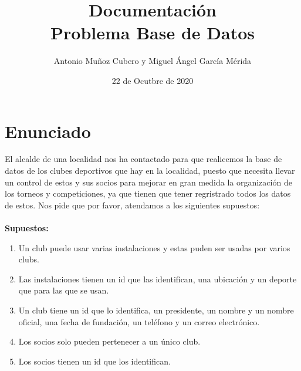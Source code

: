 \documentclass{article}
\title{Documentación \\\large \textbf{Problema Base de Datos}}
\author{Antonio Muñoz Cubero y Miguel Ángel García Mérida}
\date{22 de Ocutbre de 2020}
\begin{document}
  \maketitle
  \newpage
    \section{Enunciado}
      El alcalde de una localidad nos ha contactado para que realicemos la base de datos de los clubes deportivos que hay en la localidad, puesto que necesita llevar un 
      control de estos y sus socios para mejorar en gran medida la organización de los torneos y competiciones, ya que tienen que tener regristrado todos los datos de estos. 
      Nos pide que por favor, atendamos a los siguientes supuestos:
    \\
    \\
    \textbf{Supuestos:}
    \\
      \begin{enumerate}
        
        \item Un club puede usar varias instalaciones y estas puden ser usadas por varios clubs.
        \item Las instalaciones tienen un id que las identifican, una ubicación y un deporte que para las que se usan.
        \item Un club tiene un id que lo identifica, un presidente, un nombre y un nombre oficial, una fecha de fundación, un teléfono y un correo electrónico.
        \item Los socios solo pueden pertenecer a un único club.
        \item Los socios tienen un id que los identifican.

      \end{enumerate}
\end{document}
